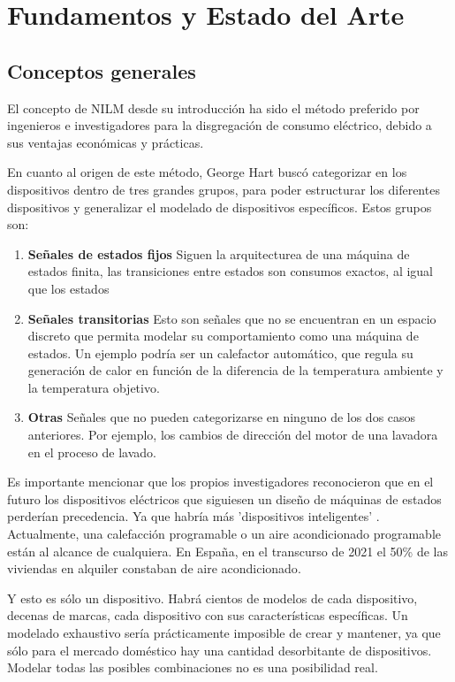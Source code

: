 \chapter{Fundamentos y Estado del Arte}
\label{ch:fundamentos}

\section{Conceptos generales}
\label{se:ConceptosGeneralesa}

El concepto de NILM desde su introducción ha sido el método preferido por ingenieros e investigadores para la disgregación de consumo eléctrico, debido a sus ventajas económicas y prácticas.\autocite[pág. 2, pár. 4]{Nalmpantis2019}

En cuanto al origen de este método, George Hart buscó categorizar en \autocite{192069} los dispositivos dentro de tres grandes grupos, para poder estructurar los diferentes dispositivos y generalizar el modelado de dispositivos específicos. 
Estos grupos son: 

\begin{enumerate}
\item \textbf{Señales de estados fijos} Siguen la arquitecturea de una máquina de estados finita, las transiciones entre estados son consumos exactos, al igual que los estados
\item \textbf{Señales transitorias} Esto son señales que no se encuentran en un espacio discreto que permita modelar su comportamiento como una máquina de estados. Un ejemplo podría ser un calefactor automático, que regula su generación de calor en función de la diferencia de la temperatura ambiente y la temperatura objetivo.
\item \textbf{Otras} Señales que no pueden categorizarse en ninguno de los dos casos anteriores. Por ejemplo, los cambios de dirección del motor de una lavadora en el proceso de lavado. 
\end{enumerate}

Es importante mencionar que los propios investigadores reconocieron que en el futuro los dispositivos eléctricos que siguiesen un diseño de máquinas de estados perderían precedencia. Ya que habría más 'dispositivos inteligentes' \autocite{192069}. Actualmente, una calefacción programable o un aire acondicionado programable están al alcance de cualquiera.
En España, en el transcurso de 2021 el 50\% de las viviendas en alquiler constaban de aire acondicionado\autocite{idealista2021}. 

Y esto es sólo un dispositivo. Habrá cientos de modelos de cada dispositivo, decenas de marcas, cada dispositivo con sus características específicas. 
Un modelado exhaustivo sería prácticamente imposible de crear y mantener, ya que sólo para el mercado doméstico hay una cantidad desorbitante de dispositivos. Modelar todas las posibles combinaciones no es una posibilidad real.

